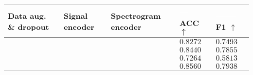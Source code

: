 \begin{tabular}{>{\centering\arraybackslash}p{}>{\centering\arraybackslash}p{}>{\centering\arraybackslash}p{}>{\raggedright\arraybackslash}p{}>{\raggedright\arraybackslash}p{}}
    \hline
	Data aug. \& dropout  & Signal encoder & Spectrogram encoder & \textcolor{white}{---} ACC $\uparrow$ & \textcolor{white}{-------} F1 $\uparrow$ \\
	\hline
	\xmark & \cmark & \cmark & $0.8272$ & $0.7493$ \\
	\cmark & \xmark & \cmark & $0.8440$ & $0.7855$ \\
	\cmark & \cmark & \xmark & $0.7264$ & $0.5813$ \\
	\cmark & \cmark & \cmark & $\mathbf{0.8560}$ & $\mathbf{0.7938}$ \\
	\hline
\end{tabular}